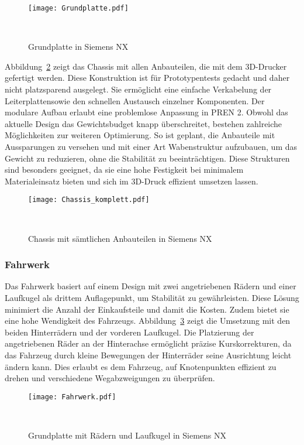 \documentclass[main.tex]{subfiles} %
\begin{document}
\begin{figure}[H]
    \centering
    \texttt{[image: Grundplatte.pdf]}
    \caption{Grundplatte in Siemens NX}~\label{fig:Grundplatte}
\end{figure}

Abbildung~\ref{fig:Chassis_komplett} zeigt das Chassis mit allen Anbauteilen,
die mit dem 3D-Drucker gefertigt werden. Diese Konstruktion ist für
Prototypentests gedacht und daher nicht platzsparend ausgelegt. Sie ermöglicht
eine einfache Verkabelung der Leiterplattensowie den schnellen Austausch
einzelner Komponenten. Der modulare Aufbau erlaubt eine problemlose Anpassung
in PREN 2. Obwohl das aktuelle Design das Gewichtsbudget knapp überschreitet,
bestehen zahlreiche Möglichkeiten zur weiteren Optimierung. So ist geplant, die
Anbauteile mit Aussparungen zu versehen und mit einer Art Wabenstruktur
aufzubauen, um das Gewicht zu reduzieren, ohne die Stabilität zu
beeinträchtigen. Diese Strukturen sind besonders geeignet, da sie eine hohe
Festigkeit bei minimalem Materialeinsatz bieten und sich im 3D-Druck effizient
umsetzen lassen.

\begin{figure}[H]
    \centering
    \texttt{[image: Chassis\_komplett.pdf]}
    \caption{Chassis mit sämtlichen Anbauteilen in Siemens NX}~\label{fig:Chassis_komplett}
\end{figure}

\newpage

\subsubsection*{Fahrwerk}

Das Fahrwerk basiert auf einem Design mit zwei angetriebenen Rädern und einer
Laufkugel als drittem Auflagepunkt, um Stabilität zu gewährleisten. Diese
Lösung minimiert die Anzahl der Einkaufsteile und damit die Kosten. Zudem
bietet sie eine hohe Wendigkeit des Fahrzeugs. Abbildung~\ref{fig:Fahrwerk}
zeigt die Umsetzung mit den beiden Hinterrädern und der vorderen Laufkugel. Die
Platzierung der angetriebenen Räder an der Hinterachse ermöglicht präzise
Kurskorrekturen, da das Fahrzeug durch kleine Bewegungen der Hinterräder seine
Ausrichtung leicht ändern kann. Dies erlaubt es dem Fahrzeug, auf Knotenpunkten
effizient zu drehen und verschiedene Wegabzweigungen zu überprüfen.

\begin{figure}[H]
    \centering
    \texttt{[image: Fahrwerk.pdf]}
    \caption{Grundplatte mit Rädern und Laufkugel in Siemens NX}~\label{fig:Fahrwerk}
\end{figure}
\end{document}

